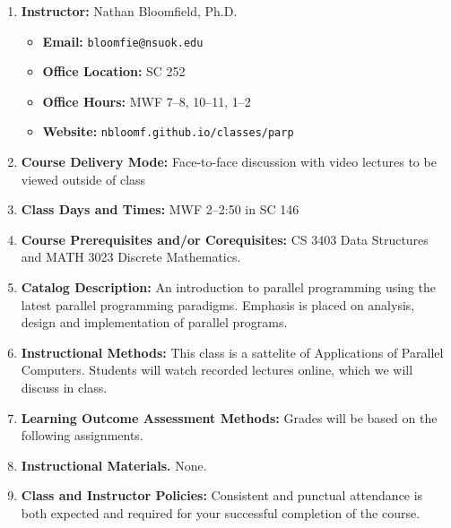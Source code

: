 \documentclass{article}
\begin{document}
\begin{enumerate}
\item \textbf{Instructor:} Nathan Bloomfield, Ph.D.
\begin{itemize}
\item \textbf{Email:} \texttt{bloomfie@nsuok.edu}
\item \textbf{Office Location:} SC 252 
\item \textbf{Office Hours:} MWF 7--8, 10--11, 1--2
\item \textbf{Website:} \texttt{nbloomf.github.io/classes/parp}
\end{itemize}


\item \textbf{Course Delivery Mode:} Face-to-face discussion with video lectures to be viewed outside of class


\item \textbf{Class Days and Times:} MWF 2--2:50 in SC 146


\item \textbf{Course Prerequisites and/or Corequisites:} CS 3403 Data Structures and MATH 3023 Discrete Mathematics.


\item \textbf{Catalog Description:} An introduction to parallel programming using the latest parallel programming paradigms. Emphasis is placed on analysis, design and implementation of parallel programs.


\item \textbf{Instructional Methods:} This class is a sattelite of Applications of Parallel Computers. Students will watch recorded lectures online, which we will discuss in class.


\item \textbf{Learning Outcome Assessment Methods:} Grades will be based on the following assignments.


\item \textbf{Instructional Materials.} None.


\item \textbf{Class and Instructor Policies:} Consistent and punctual attendance is both expected and required for your successful completion of the course.



\end{enumerate}
\end{document}
